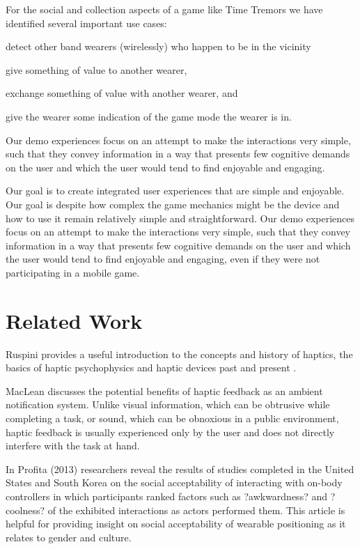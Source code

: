 \documentclass{chi-ext}
\begin{document}
For the social and collection aspects of a game like Time Tremors we have identified several important use cases: 
\begin{inparaenum}
\item detect other band wearers (wirelessly) who happen to be in the vicinity
\item give something of value to another wearer, 
\item exchange something of value with another wearer, and
\item give the wearer some indication of the game mode the wearer is in.
\end{inparaenum}

Our demo experiences focus on an attempt to make the interactions very simple, such that they convey information in a way that presents few cognitive demands on the user and which the user would tend to find enjoyable and engaging.

Our goal is to create integrated user experiences that are simple and enjoyable. Our goal is despite how complex the game mechanics might be the device and how to use it remain relatively simple and straightforward.  Our demo experiences focus on an attempt to make the interactions very simple, such that they convey information in a way that presents few cognitive demands on the user and which the user would tend to find enjoyable and engaging, even if they were not participating in a mobile game. 

\section{Related Work}

Ruspini provides a useful introduction to the concepts and history of haptics, the basics of haptic psychophysics and haptic devices past and present \cite{ruspini1999haptics}.

MacLean \cite{maclean2009putting} discusses the potential benefits of haptic feedback as an ambient notification system. Unlike visual information, which can be obtrusive while completing a task, or sound, which can be obnoxious in a public environment, haptic feedback is usually experienced only by the user and does not directly interfere with the task at hand. 

In Profita (2013) \cite{profita2013don} researchers reveal the results of studies completed in the United States and South Korea on the social acceptability of interacting with on-body controllers in which participants  ranked factors such as ?awkwardness? and ?coolness? of the exhibited interactions as actors performed them. This article is helpful for providing insight on social acceptability of wearable positioning as it relates to gender and culture.
\end{document}
